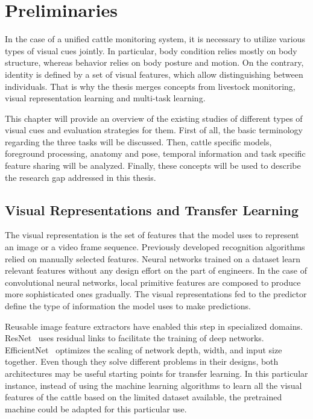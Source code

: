 
\section{Preliminaries}

In the case of a unified cattle monitoring system, it is necessary to utilize various types of visual cues jointly. In particular, body condition relies mostly on body structure, whereas behavior relies on body posture and motion. On the contrary, identity is defined by a set of visual features, which allow distinguishing between individuals. That is why the thesis merges concepts from livestock monitoring, visual representation learning and multi-task learning.

This chapter will provide an overview of the existing studies of different types of visual cues and evaluation strategies for them. First of all, the basic terminology regarding the three tasks will be discussed. Then, cattle specific models, foreground processing, anatomy and pose, temporal information and task specific feature sharing will be analyzed. Finally, these concepts will be used to describe the research gap addressed in this thesis.

\subsection{Visual Representations and Transfer Learning}

The visual representation is the set of features that the model uses to represent an image or a video frame sequence. Previously developed recognition algorithms relied on manually selected features. Neural networks trained on a dataset learn relevant features without any design effort on the part of engineers. In the case of convolutional neural networks, local primitive features are composed to produce more sophisticated ones gradually. The visual representations fed to the predictor define the type of information the model uses to make predictions.

Reusable image feature extractors have enabled this step in specialized domains. ResNet~\cite{he2016resnet} uses residual links to facilitate the training of deep networks. EfficientNet~\cite{efficientnet2019} optimizes the scaling of network depth, width, and input size together. Even though they solve different problems in their designs, both architectures may be useful starting points for transfer learning. In this particular instance, instead of using the machine learning algorithms to learn all the visual features of the cattle based on the limited dataset available, the pretrained machine could be adapted for this particular use.

